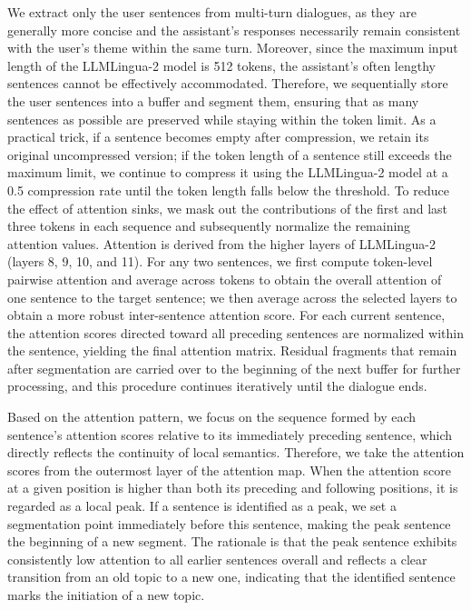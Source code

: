 We extract only the user sentences from multi-turn dialogues, as they are generally more concise and the assistant’s responses necessarily remain consistent with the user’s theme within the same turn. Moreover, since the maximum input length of the LLMLingua-2 \cite{pan2024llmlingua} model is 512 tokens, the assistant’s often lengthy sentences cannot be effectively accommodated. Therefore, we sequentially store the user sentences into a buffer and segment them, ensuring that as many sentences as possible are preserved while staying within the token limit. As a practical trick, if a sentence becomes empty after compression, we retain its original uncompressed version; if the token length of a sentence still exceeds the maximum limit, we continue to compress it using the LLMLingua-2 model at a 0.5 compression rate until the token length falls below the threshold. To reduce the effect of attention sinks, we mask out the contributions of the first and last three tokens in each sequence and subsequently normalize the remaining attention values. Attention is derived from the higher layers of LLMLingua-2 (layers 8, 9, 10, and 11). For any two sentences, we first compute token-level pairwise attention and average across tokens to obtain the overall attention of one sentence to the target sentence; we then average across the selected layers to obtain a more robust inter-sentence attention score. For each current sentence, the attention scores directed toward all preceding sentences are normalized within the sentence, yielding the final attention matrix. Residual fragments that remain after segmentation are carried over to the beginning of the next buffer for further processing, and this procedure continues iteratively until the dialogue ends.




Based on the attention pattern, we focus on the sequence formed by each sentence’s attention scores relative to its immediately preceding sentence, which directly reflects the continuity of local semantics. Therefore, we take the attention scores from the outermost layer of the attention map. When the attention score at a given position is higher than both its preceding and following positions, it is regarded as a local peak. If a sentence is identified as a peak, we set a segmentation point immediately before this sentence, making the peak sentence the beginning of a new segment. The rationale is that the peak sentence exhibits consistently low attention to all earlier sentences overall and reflects a clear transition from an old topic to a new one, indicating that the identified sentence marks the initiation of a new topic.

